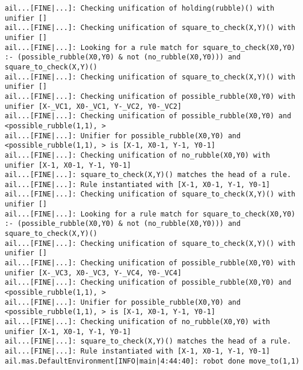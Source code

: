 \begin{small}
\begin{verbatim}
ail...[FINE|...]: Checking unification of holding(rubble)() with unifier [] 
ail...[FINE|...]: Checking unification of square_to_check(X,Y)() with unifier [] 
ail...[FINE|...]: Looking for a rule match for square_to_check(X0,Y0) :- (possible_rubble(X0,Y0) & not (no_rubble(X0,Y0))) and square_to_check(X,Y)() 
ail...[FINE|...]: Checking unification of square_to_check(X,Y)() with unifier [] 
ail...[FINE|...]: Checking unification of possible_rubble(X0,Y0) with unifier [X-_VC1, X0-_VC1, Y-_VC2, Y0-_VC2] 
ail...[FINE|...]: Checking unification of possible_rubble(X0,Y0) and <possible_rubble(1,1), > 
ail...[FINE|...]: Unifier for possible_rubble(X0,Y0) and <possible_rubble(1,1), > is [X-1, X0-1, Y-1, Y0-1] 
ail...[FINE|...]: Checking unification of no_rubble(X0,Y0) with unifier [X-1, X0-1, Y-1, Y0-1] 
ail...[FINE|...]: square_to_check(X,Y)() matches the head of a rule. 
ail...[FINE|...]: Rule instantiated with [X-1, X0-1, Y-1, Y0-1] 
ail...[FINE|...]: Checking unification of square_to_check(X,Y)() with unifier [] 
ail...[FINE|...]: Looking for a rule match for square_to_check(X0,Y0) :- (possible_rubble(X0,Y0) & not (no_rubble(X0,Y0))) and square_to_check(X,Y)() 
ail...[FINE|...]: Checking unification of square_to_check(X,Y)() with unifier [] 
ail...[FINE|...]: Checking unification of possible_rubble(X0,Y0) with unifier [X-_VC3, X0-_VC3, Y-_VC4, Y0-_VC4] 
ail...[FINE|...]: Checking unification of possible_rubble(X0,Y0) and <possible_rubble(1,1), > 
ail...[FINE|...]: Unifier for possible_rubble(X0,Y0) and <possible_rubble(1,1), > is [X-1, X0-1, Y-1, Y0-1] 
ail...[FINE|...]: Checking unification of no_rubble(X0,Y0) with unifier [X-1, X0-1, Y-1, Y0-1] 
ail...[FINE|...]: square_to_check(X,Y)() matches the head of a rule. 
ail...[FINE|...]: Rule instantiated with [X-1, X0-1, Y-1, Y0-1] 
ail.mas.DefaultEnvironment[INFO|main|4:44:40]: robot done move_to(1,1) 
\end{verbatim}
\end{small}

